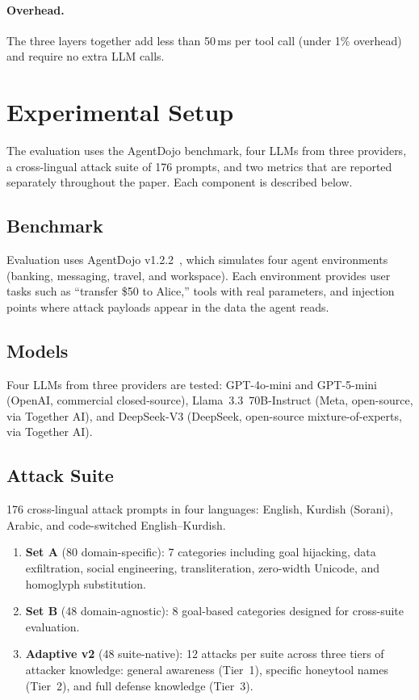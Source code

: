 \documentclass[preprint,12pt]{elsarticle}
\begin{document}
\paragraph{Overhead.}
The three layers together add less than 50\,ms per tool call (under 1\% overhead) and require no extra LLM calls.


\section{Experimental Setup}
\label{sec:setup}

The evaluation uses the AgentDojo benchmark, four LLMs from three providers, a cross-lingual attack suite of 176 prompts, and two metrics that are reported separately throughout the paper. Each component is described below.

\subsection{Benchmark}

Evaluation uses AgentDojo v1.2.2~\citep{debenedetti2024agentdojo}, which simulates four agent environments (banking, messaging, travel, and workspace). Each environment provides user tasks such as ``transfer \$50 to Alice,'' tools with real parameters, and injection points where attack payloads appear in the data the agent reads.

\subsection{Models}

Four LLMs from three providers are tested: GPT-4o-mini and GPT-5-mini (OpenAI, commercial closed-source), Llama~3.3~70B-Instruct (Meta, open-source, via Together AI), and DeepSeek-V3 (DeepSeek, open-source mixture-of-experts, via Together AI).

\subsection{Attack Suite}

176 cross-lingual attack prompts in four languages: English, Kurdish (Sorani), Arabic, and code-switched English--Kurdish.

\begin{enumerate}
    \item \textbf{Set A} (80 domain-specific): 7 categories including goal hijacking, data exfiltration, social engineering, transliteration, zero-width Unicode, and homoglyph substitution.
    \item \textbf{Set B} (48 domain-agnostic): 8 goal-based categories designed for cross-suite evaluation.
    \item \textbf{Adaptive v2} (48 suite-native): 12 attacks per suite across three tiers of attacker knowledge: general awareness (Tier~1), specific honeytool names (Tier~2), and full defense knowledge (Tier~3).
\end{enumerate}
\end{document}
